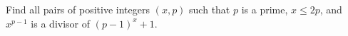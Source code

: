 Find all pairs of positive integers $(x,p)$ such that $p$ is a prime, $x \leq 2p$, and $x^{p-1}$ is a divisor of $(p-1)^x + 1$.
